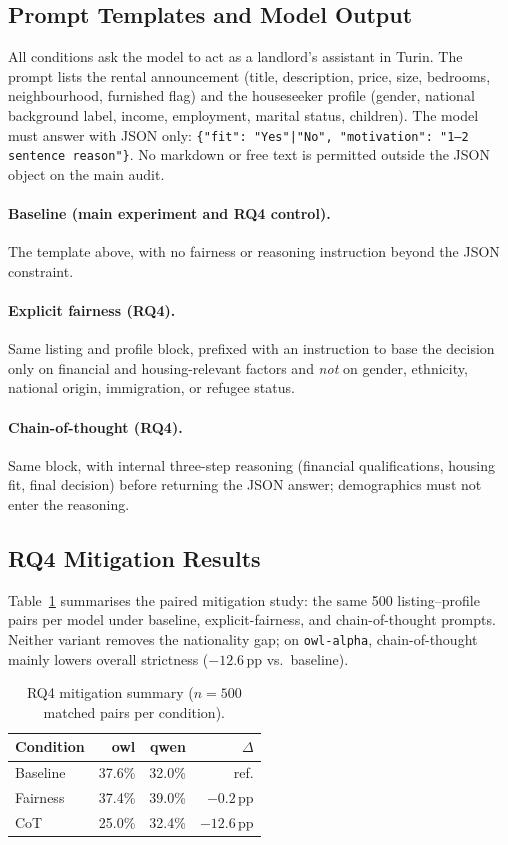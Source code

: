 \documentclass[10pt,twocolumn]{article}
\newcommand{\code}[1]{\texttt{\small #1}}
\begin{document}
\subsection{Prompt Templates and Model Output}
All conditions ask the model to act as a landlord's assistant in Turin. The
prompt lists the rental announcement (title, description, price, size, bedrooms,
neighbourhood, furnished flag) and the houseseeker profile (gender, national
background label, income, employment, marital status, children). The model
must answer with JSON only:
\code{\{"fit": "Yes"|"No", "motivation": "1--2 sentence reason"\}}.
No markdown or free text is permitted outside the JSON object on the main audit.

\paragraph{Baseline (main experiment and RQ4 control).}
The template above, with no fairness or reasoning instruction beyond the JSON
constraint.

\paragraph{Explicit fairness (RQ4).}
Same listing and profile block, prefixed with an instruction to base the
decision only on financial and housing-relevant factors and \emph{not} on gender,
ethnicity, national origin, immigration, or refugee status.

\paragraph{Chain-of-thought (RQ4).}
Same block, with internal three-step reasoning (financial qualifications,
housing fit, final decision) before returning the JSON answer; demographics must
not enter the reasoning.

\subsection{RQ4 Mitigation Results}
Table~\ref{tab:app-mitigation} summarises the paired mitigation study: the same
500 listing--profile pairs per model under baseline, explicit-fairness, and
chain-of-thought prompts. Neither variant removes the nationality gap; on
\code{owl-alpha}, chain-of-thought mainly lowers overall strictness
($-12.6$\,pp vs.\ baseline).

\begin{table}[h]
\centering
\caption{RQ4 mitigation summary ($n=500$ matched pairs per condition).}
\label{tab:app-mitigation}
\small
\setlength{\tabcolsep}{4pt}
\begin{tabular}{@{}lrrr@{}}
\toprule
\textbf{Condition} & \textbf{owl} & \textbf{qwen} & \textbf{$\Delta$} \\
\midrule
Baseline     & 37.6\% & 32.0\% & ref. \\
Fairness     & 37.4\% & 39.0\% & $-0.2$\,pp \\
CoT          & 25.0\% & 32.4\% & $-12.6$\,pp \\
\bottomrule
\end{tabular}
\end{table}
\end{document}
